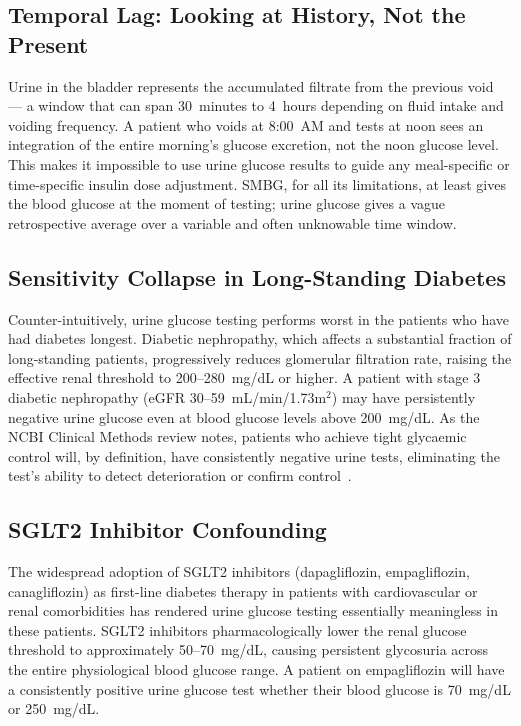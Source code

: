 \subsection*{Temporal Lag: Looking at History, Not the Present}

Urine in the bladder represents the accumulated filtrate from the previous void --- a window that can span 30~minutes to 4~hours depending on fluid intake and voiding frequency. A patient who voids at 8:00~AM and tests at noon sees an integration of the entire morning's glucose excretion, not the noon glucose level. This makes it impossible to use urine glucose results to guide any meal-specific or time-specific insulin dose adjustment. SMBG, for all its limitations, at least gives the blood glucose at the moment of testing; urine glucose gives a vague retrospective average over a variable and often unknowable time window.

\subsection*{Sensitivity Collapse in Long-Standing Diabetes}

Counter-intuitively, urine glucose testing performs worst in the patients who have had diabetes longest. Diabetic nephropathy, which affects a substantial fraction of long-standing patients, progressively reduces glomerular filtration rate, raising the effective renal threshold to 200--280~mg/dL or higher. A patient with stage 3 diabetic nephropathy (eGFR 30--59~mL/min/1.73m$^2$) may have persistently negative urine glucose even at blood glucose levels  above 200~mg/dL. As the NCBI Clinical Methods review notes, patients who achieve tight glycaemic control will, by definition, have consistently negative urine tests, eliminating the test's ability to detect deterioration or confirm control~\cite{ncbi_glucosuria}.

\subsection*{SGLT2 Inhibitor Confounding}

The widespread adoption of SGLT2 inhibitors (dapagliflozin, empagliflozin, canagliflozin) as first-line diabetes therapy in patients with cardiovascular or renal comorbidities has rendered urine glucose testing essentially meaningless in these patients. SGLT2 inhibitors pharmacologically lower the renal glucose threshold to approximately 50--70~mg/dL, causing persistent glycosuria across the entire physiological blood glucose range. A patient on empagliflozin will have a consistently positive urine glucose test whether their blood glucose is 70~mg/dL or 250~mg/dL.

